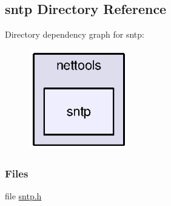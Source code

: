 \subsection{sntp Directory Reference}
\label{dir_0f16ffeaa3f2b1f072efa08face48775}
Directory dependency graph for sntp\+:
\nopagebreak
\begin{figure}[H]
\begin{center}
\leavevmode
\includegraphics[width=123pt]{dir_0f16ffeaa3f2b1f072efa08face48775_dep}
\end{center}
\end{figure}
\subsubsection*{Files}
\begin{DoxyCompactItemize}
\item 
file \hyperlink{sntp_8h}{sntp.\+h}
\end{DoxyCompactItemize}

